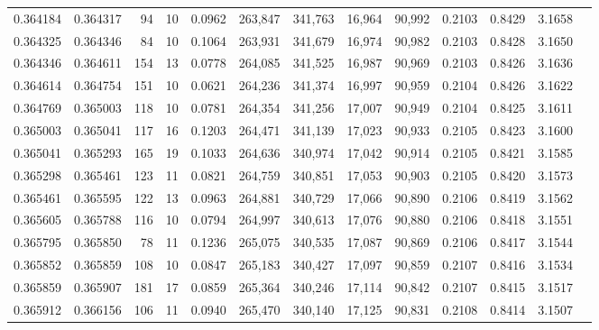 \begin{tabular}{rrrrrrrrrrrrr}
0.364184 & 0.364317 &    94 &  10 &                                     0.0962 & 263,847 & 341,763 &  16,964 &  90,992 & 0.2103 & 0.8429 & 3.1658 \\
0.364325 & 0.364346 &    84 &  10 &                                     0.1064 & 263,931 & 341,679 &  16,974 &  90,982 & 0.2103 & 0.8428 & 3.1650 \\
0.364346 & 0.364611 &   154 &  13 &                                     0.0778 & 264,085 & 341,525 &  16,987 &  90,969 & 0.2103 & 0.8426 & 3.1636 \\
0.364614 & 0.364754 &   151 &  10 &                                     0.0621 & 264,236 & 341,374 &  16,997 &  90,959 & 0.2104 & 0.8426 & 3.1622 \\
0.364769 & 0.365003 &   118 &  10 &                                     0.0781 & 264,354 & 341,256 &  17,007 &  90,949 & 0.2104 & 0.8425 & 3.1611 \\
0.365003 & 0.365041 &   117 &  16 &                                     0.1203 & 264,471 & 341,139 &  17,023 &  90,933 & 0.2105 & 0.8423 & 3.1600 \\
0.365041 & 0.365293 &   165 &  19 &                                     0.1033 & 264,636 & 340,974 &  17,042 &  90,914 & 0.2105 & 0.8421 & 3.1585 \\
0.365298 & 0.365461 &   123 &  11 &                                     0.0821 & 264,759 & 340,851 &  17,053 &  90,903 & 0.2105 & 0.8420 & 3.1573 \\
0.365461 & 0.365595 &   122 &  13 &                                     0.0963 & 264,881 & 340,729 &  17,066 &  90,890 & 0.2106 & 0.8419 & 3.1562 \\
0.365605 & 0.365788 &   116 &  10 &                                     0.0794 & 264,997 & 340,613 &  17,076 &  90,880 & 0.2106 & 0.8418 & 3.1551 \\
0.365795 & 0.365850 &    78 &  11 &                                     0.1236 & 265,075 & 340,535 &  17,087 &  90,869 & 0.2106 & 0.8417 & 3.1544 \\
0.365852 & 0.365859 &   108 &  10 &                                     0.0847 & 265,183 & 340,427 &  17,097 &  90,859 & 0.2107 & 0.8416 & 3.1534 \\
0.365859 & 0.365907 &   181 &  17 &                                     0.0859 & 265,364 & 340,246 &  17,114 &  90,842 & 0.2107 & 0.8415 & 3.1517 \\
0.365912 & 0.366156 &   106 &  11 &                                     0.0940 & 265,470 & 340,140 &  17,125 &  90,831 & 0.2108 & 0.8414 & 3.1507 \\

\end{tabular}
